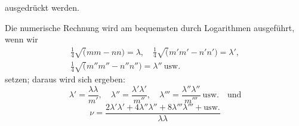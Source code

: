 ausgedrückt werden.
\par Die numerische Rechnung wird am bequemsten durch Logarithmen ausgeführt, wenn wir
\[
\begin{gathered}\tfrac14\surd(mm-nn)=\lambda,\quad\tfrac14\surd(m'm'-n'n')=\lambda',\\[6pt]\tfrac14\surd(m''m''-n''n'')=\lambda''\ \mathrm{usw.}\end{gathered}
\]
setzen; daraus wird sich ergeben:
\[
\lambda'=\frac{\lambda\lambda}{m'},\quad
\lambda''=\frac{\lambda'\lambda'}{m''},\quad
\lambda'''=\frac{\lambda''\lambda''}{m'''}\ \mathrm{usw.}\quad\text{und}
\]
\[
\nu=\frac{2\lambda'\lambda'+4\lambda''\lambda''+8\lambda'''\lambda'''+\mathrm{usw.}}{\lambda\lambda}
\]

\clearpage
\endgroup
